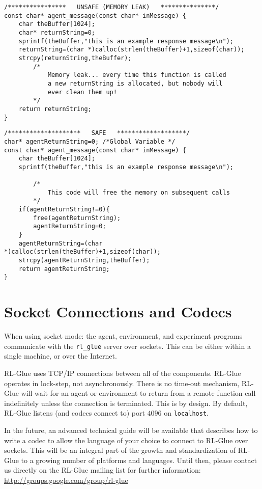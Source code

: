 \documentclass[11pt]{article}
\begin{document}
\begin{verbatim}
/****************   UNSAFE (MEMORY LEAK)   ***************/
const char* agent_message(const char* inMessage) {
    char theBuffer[1024];
    char* returnString=0;
    sprintf(theBuffer,"this is an example response message\n");
    returnString=(char *)calloc(strlen(theBuffer)+1,sizeof(char));
    strcpy(returnString,theBuffer);
        /*
            Memory leak... every time this function is called
            a new returnString is allocated, but nobody will
            ever clean them up!
        */
    return returnString;
}
\end{verbatim}

\begin{verbatim}
/********************   SAFE   *******************/
char* agentReturnString=0; /*Global Variable */	
const char* agent_message(const char* inMessage) {
    char theBuffer[1024];
    sprintf(theBuffer,"this is an example response message\n");

        /*
            This code will free the memory on subsequent calls
        */
    if(agentReturnString!=0){
        free(agentReturnString);
        agentReturnString=0;
    }
    agentReturnString=(char *)calloc(strlen(theBuffer)+1,sizeof(char));
    strcpy(agentReturnString,theBuffer);
    return agentReturnString;
}
\end{verbatim}



\section{Socket Connections and Codecs}
When using socket mode: the agent, environment, and experiment programs communicate with the \texttt{rl\_glue} server over sockets.  This can be either within a single machine, or over the Internet.

RL-Glue uses TCP/IP connections between all of the components.  RL-Glue operates in lock-step, not asynchronously.  There is no time-out mechanism, RL-Glue will wait for an agent or environment to return from a remote function call indefinitely unless the connection is terminated.  This is by design.   By default, RL-Glue listens (and codecs connect to) port $4096$ on \texttt{localhost}.

In the future, an advanced technical guide will be available that describes how to write a codec to allow the language of your choice to connect to RL-Glue over sockets.  This will be an integral part of the growth and standardization of RL-Glue to a growing number of platforms and languages.  Until then, please contact us directly on the RL-Glue mailing list for further information:\\
\url{http://groups.google.com/group/rl-glue}
\end{document}
